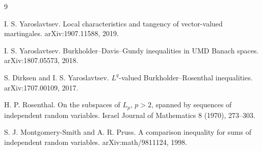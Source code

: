 \documentclass[11pt]{article}
\begin{document}
\begin{thebibliography}{9}

I. S. Yaroslavtsev.
\newblock Local characteristics and tangency of vector-valued martingales.
\newblock arXiv:1907.11588, 2019.

I. S. Yaroslavtsev.
\newblock Burkholder--Davis--Gundy inequalities in UMD Banach spaces.
\newblock arXiv:1807.05573, 2018.

S. Dirksen and I. S. Yaroslavtsev.
\newblock \(L^q\)-valued Burkholder--Rosenthal inequalities.
\newblock arXiv:1707.00109, 2017.

H. P. Rosenthal.
\newblock On the subspaces of \(L_p\), \(p>2\), spanned by sequences of
  independent random variables.
\newblock Israel Journal of Mathematics 8 (1970), 273--303.

S. J. Montgomery-Smith and A. R. Pruss.
\newblock A comparison inequality for sums of independent random variables.
\newblock arXiv:math/9811124, 1998.

\end{thebibliography}
\end{document}
